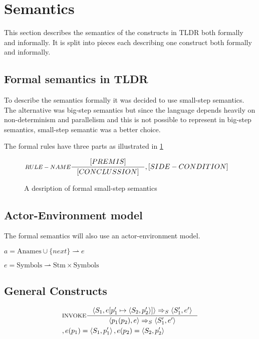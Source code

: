 \section{Semantics}
This section describes the semantics of the constructs in TLDR both formally and informally. It is split into pieces each describing one construct both formally and informally.

\subsection{Formal semantics in TLDR}
To describe the semantics formally it was decided to use small-step semantics. The alternative was big-step semantics but since the language depends heavily on non-determinism and parallelism and this is not possible to represent in big-step semantics, small-step semantic was a better choice.

The formal rules have three parts as illustrated in \cref{SS-semantics}

\begin{figure}[H]
\begin{align*}
&\inference[$RULE-NAME$]{[PREMIS]}
												{[CONCLUSSION]}
												{,[SIDE-CONDITION]}
\end{align*}
\caption{A desription of formal small-step semantics}
\label{SS-semantics}
\end{figure}

\subsection{Actor-Environment model}
The formal semantics will also use an actor-environment model.

$a = \text{Anames} \cup \{next\} \rightharpoonup e$

$e = \text{Symbols} \rightharpoonup \text{Stm} \times \text{Symbols}$

\subsection{General Constructs}
\begin{align*}
&\inference[$\text{INVOKE}$]{\Braket{S_1,e[p_1' \mapsto \Braket{S_2,p_2'}]} \Rightarrow_S \Braket{S_1',e'}}
                  {\Braket{p_1(p_2),e} \Rightarrow_S \Braket{S_1',e'}}
\\
&									{,e(p_1) = \Braket{S_1,p_1'}, e(p_2) = \Braket{S_2,p_2'}}
\end{align*}

